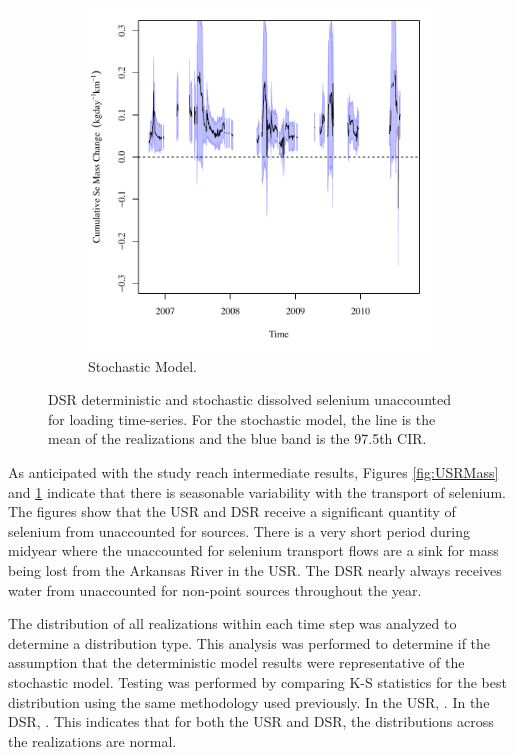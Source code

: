 \begin{linenumbers}
\begin{landscape}
\begin{figure}
\begin{subfigure}{0.7\textwidth}
			\includegraphics[width=\tableCustomSize]{"Figures/Results_DSR/Stochastic/Balance Mass"}
			\caption{Stochastic Model.}
		\end{subfigure}
		\caption[DSR deterministic and stochastic dissolved selenium unaccounted for loading time-series.]{DSR deterministic and stochastic dissolved selenium unaccounted for loading time-series.  For the stochastic model, the line is the mean of the realizations and the blue band is the 97.5th CIR.}
		\label{fig:DSRMass}
	\end{figure}
\end{landscape}

As anticipated with the study reach intermediate results, Figures \ref{fig:USRMass} and \ref{fig:DSRMass} indicate that there is seasonable variability with the transport of selenium.  The figures show that the USR and DSR receive a significant quantity of selenium from unaccounted for sources.  There is a very short period during midyear where the unaccounted for selenium transport flows are a sink for mass being lost from the Arkansas River in the USR.  The DSR nearly always receives water from unaccounted for non-point sources throughout the year.

The distribution of all realizations within each time step was analyzed to determine a distribution type.  This analysis was performed to determine if the assumption that the deterministic model results were representative of the stochastic model.   Testing was performed by comparing K-S statistics for the best distribution using the same methodology used previously.  In the USR, .  In the DSR, .  This indicates that for both the USR and DSR, the distributions across the realizations are normal.  


\end{linenumbers}
